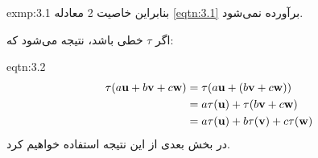 {\begin{spacing}{1.5}
\begin{exmp}{exmp:3.1}
            بنابراین خاصیت 2 معادله \ref{eqtn:3.1} برآورده نمی‌شود.
        \end{exmp}

        اگر $\tau$ خطی باشد، نتیجه می‌شود که:
        \begin{eqtn}{eqtn:3.2}
            \begin{equation*}
                \centering
                \begin{split}
                    \tau(a\textbf{u}+b\textbf{v}+c\textbf{w})&=\tau(a\textbf{u}+(b\textbf{v}+c\textbf{w})) \\
                    &=a\tau(\textbf{u})+\tau(b\textbf{v}+c\textbf{w})\\
                    &=a\tau(\textbf{u})+b\tau(\textbf{v})+c\tau(\textbf{w})
                \end{split}
            \end{equation*}
            در بخش بعدی از این نتیجه استفاده خواهیم کرد.
        \end{eqtn}
    \end{spacing}
}

